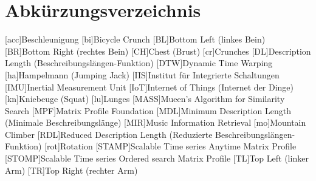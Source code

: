 \section*{Abk{\"u}rzungsverzeichnis}
\begin{acronym}[acro]
	[acc]{Beschleunigung}
	[bi]{Bicycle Crunch}
	[BL]{Bottom Left (linkes Bein)}
	[BR]{Bottom Right (rechtes Bein)}
	[CH]{Chest (Brust)}
	[cr]{Crunches}
	[DL]{Description Length (Beschreibungslängen-Funktion)}
	[DTW]{Dynamic Time Warping}
	[ha]{Hampelmann (Jumping Jack)}
	[IIS]{Institut für Integrierte Schaltungen}
	[IMU]{Inertial Measurement Unit}
	[IoT]{Internet of Things (Internet der Dinge)}
	[kn]{Kniebeuge (Squat)}
	[lu]{Lunges}
	[MASS]{Mueen's Algorithm for Similarity Search}
	[MPF]{Matrix Profile Foundation}
	[MDL]{Minimum Description Length (Minimale Beschreibungslänge)}
	[MIR]{Music Information Retrieval}
	[mo]{Mountain Climber}
	[RDL]{Reduced Description Length (Reduzierte Beschreibungslängen-Funktion)}
	[rot]{Rotation}
	[STAMP]{Scalable Time series Anytime Matrix Profile}
	[STOMP]{Scalable Time series Ordered search Matrix Profile}
	[TL]{Top Left (linker Arm)}
	[TR]{Top Right (rechter Arm)}
\end{acronym}